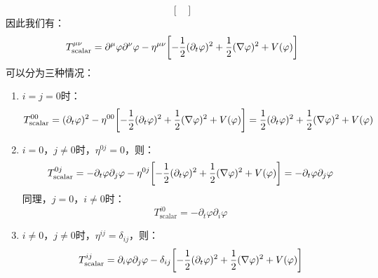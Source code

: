 \documentclass[a4paper]{article}
\begin{document}
\begin{enumerate}
\[\begin{bmatrix}
        \end{bmatrix}
    \]
    因此我们有：
    \[
        T_{\mathrm{scalar}}^{\mu\nu} = \partial^\mu \varphi \partial^\nu \varphi - \eta^{\mu\nu} \qty[-\frac{1}{2}(\partial_t \varphi)^2 + \frac{1}{2}(\nabla \varphi)^2 + V(\varphi)]
    \]
    可以分为三种情况：
    \begin{enumerate}
        \item[(1)]
        $i = j = 0$时：
        \[
            T_{\mathrm{scalar}}^{00} = (\partial_t \varphi)^2 - \eta^{00} \qty[-\frac{1}{2}(\partial_t \varphi)^2 + \frac{1}{2}(\nabla \varphi)^2 + V(\varphi)] = \frac{1}{2}(\partial_t \varphi)^2 + \frac{1}{2}(\nabla \varphi)^2 + V(\varphi)
        \]
        \item[(2)]
        $i = 0$，$j \neq 0$时，$\eta^{0j} = 0$，则：
        \[
            T_{\mathrm{scalar}}^{0j} = -\partial_t \varphi \partial_j \varphi - \eta^{0j} \qty[-\frac{1}{2}(\partial_t \varphi)^2 + \frac{1}{2}(\nabla \varphi)^2 + V(\varphi)] = -\partial_t \varphi \partial_j \varphi
        \]
        同理，$j = 0$，$i \neq 0$时：
        \[
            T_{\mathrm{scalar}}^{i0} = -\partial_t \varphi \partial_i \varphi
        \]
        \item[(3)]
        $i \neq 0$，$j \neq 0$时，$\eta^{ij} = \delta_{ij}$，则：
        \[
            T_{\mathrm{scalar}}^{ij} = \partial_i \varphi \partial_j \varphi - \delta_{ij} \qty[-\frac{1}{2}(\partial_t \varphi)^2 + \frac{1}{2}(\nabla \varphi)^2 + V(\varphi)]
        \]
    \end{enumerate}


\end{enumerate}
\end{document}
